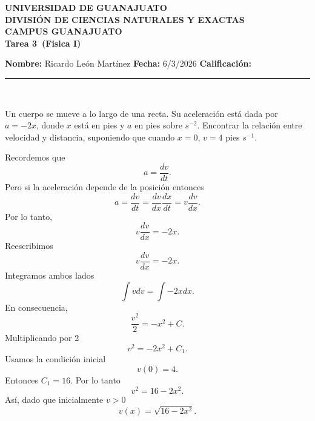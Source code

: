 \documentclass[12pt,a4paper]{article}
\newcommand{\alumno}{Ricardo León Martínez}
\newcommand{\materia}{Fisica I}
\newcommand{\tarea}{Tarea 3}
\newcommand{\fecha}{6/3/2026}
\begin{document}
    \begin{center}
    {\large\textbf{UNIVERSIDAD DE GUANAJUATO}}\\[0.3cm]
    {\normalsize\textbf{DIVISIÓN DE CIENCIAS NATURALES Y EXACTAS}}\\
    {\normalsize\textbf{CAMPUS GUANAJUATO}}\\[1cm]

    {\Large\textbf{\tarea\ (\materia)}}\\[1cm]
    \end{center}

    \textbf{Nombre:} \alumno \hfill 
    \textbf{Fecha:} \fecha \hfill 
    \textbf{Calificación:} \rule{3cm}{0.4pt} \\[0.3cm]

    \begin{mdframed}[style=mdbluebox,frametitle={Ejercicio 1}]
        Un cuerpo se mueve a lo largo de una recta. Su aceleración está dada por $a=-2x$, donde $x$ está en pies y $a$ en pies sobre $s^{-2}$. Encontrar la relación entre velocidad y distancia,
        suponiendo que cuando $x=0$, $v=4$ pies $s^{-1}$.
    \end{mdframed}

    \begin{solucion}
        Recordemos que
        \begin{equation*}
            a=\frac{dv}{dt}.
        \end{equation*}
        Pero si la aceleración depende de la posición entonces
        \begin{equation*}
            a=\frac{dv}{dt}=\frac{dv}{dx}\frac{dx}{dt}=v\frac{dv}{dx}.
        \end{equation*}
        Por lo tanto,
        \begin{equation*}
            v\frac{dv}{dx}=-2x.
        \end{equation*}
        Reescribimos
        \begin{equation*}
            v\frac{dv}{dx}=-2x.
        \end{equation*}
        Integramos ambos lados
        \begin{equation*}
            \int vdv=\int-2xdx.
        \end{equation*}
        En consecuencia,
        \begin{equation*}
            \frac{v^{2}}{2}=-x^{2}+C.
        \end{equation*}
        Multiplicando por 2
        \begin{equation*}
            v^{2}=-2x^{2}+C_{1}.
        \end{equation*}
        Usamos la condición inicial
        \begin{equation*}
            v(0)=4.
        \end{equation*}
        Entonces $C_{1}=16$. Por lo tanto
        \begin{equation*}
            v^{2}=16-2x^{2}.
        \end{equation*}
        Así, dado que inicialmente $v\gt0$
        \begin{equation*}
            v(x)=\sqrt{16-2x^{2}}.
        \end{equation*}
    \end{solucion}
\end{document}
